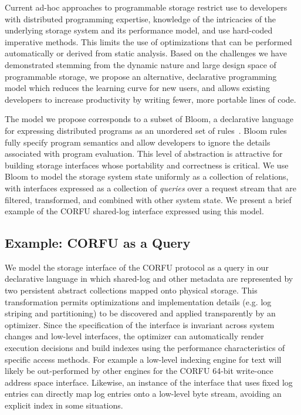 Current ad-hoc approaches to programmable storage restrict
use to developers with distributed programming expertise, knowledge of the
intricacies of the underlying storage system and its performance model, and
use hard-coded imperative methods. This limits the use of optimizations that
can be performed automatically or derived from static analysis.  Based on the
challenges we have demonstrated stemming from the dynamic nature and large
design space of programmable storage, we propose an alternative, declarative
programming model which reduces the learning curve for new users, and allows
existing developers to increase productivity by writing fewer, more portable lines of code.

The model we propose corresponds to a subset of Bloom, a
declarative language for expressing distributed programs as an unordered set
of rules~\cite{alvaro:cidr11}. Bloom rules fully specify program semantics and
allow developers to ignore the details associated with program
evaluation. This level of abstraction is attractive for building storage
interfaces whose portability and correctness is critical. We use Bloom to model the
storage system state uniformly as a collection of relations, with interfaces
expressed as a collection of \emph{queries} over a request stream that
are filtered, transformed, and combined with other system state. We present a
brief example of the CORFU shared-log interface expressed using this model.

\subsection{Example: CORFU as a Query}

We model the storage interface of the CORFU protocol as a query in our
declarative language in which shared-log and other metadata are represented by
two persistent abstract collections mapped onto physical storage. This
transformation permits optimizations and implementation details (e.g. log
striping and partitioning) to be discovered and applied transparently by an
optimizer.  Since the specification of the interface is invariant across
system changes and low-level interfaces, the optimizer can automatically
render execution decisions and build indexes using the performance
characteristics of specific access methods.  For example a low-level indexing
engine for text will likely be out-performed by other engines for the CORFU
64-bit write-once address space interface.  Likewise, an instance of the
interface that uses fixed log entries can directly map log entries onto a
low-level byte stream, avoiding an explicit index in some situations.


